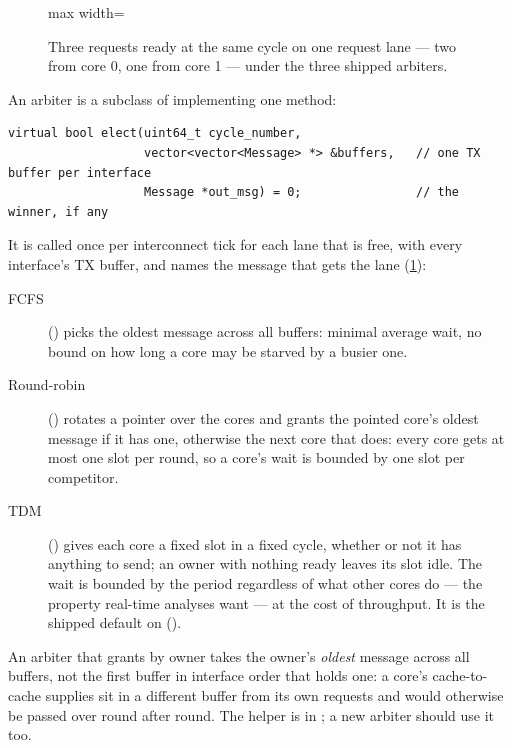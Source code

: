 \begin{figure}[htbp]\centering
\begin{adjustbox}{max width=\textwidth}\end{adjustbox}
\caption{Three requests ready at the same cycle on one request lane --- two from core 0, one
from core 1 --- under the three shipped arbiters.}
\label{fig:arbitration}
\end{figure}

An arbiter is a subclass of  implementing one method:

\begin{lstlisting}[style=cpp]
virtual bool elect(uint64_t cycle_number,
                   vector<vector<Message> *> &buffers,   // one TX buffer per interface
                   Message *out_msg) = 0;                // the winner, if any
\end{lstlisting}

It is called once per interconnect tick for each lane that is free, with every interface's TX
buffer, and names the message that gets the lane (\cref{fig:arbitration}):

\begin{description}
\item[FCFS] () picks the oldest message across all buffers: minimal average
  wait, no bound on how long a core may be starved by a busier one.
\item[Round-robin] () rotates a pointer over the cores and grants the pointed
  core's oldest message if it has one, otherwise the next core that does: every core gets at
  most one slot per round, so a core's wait is bounded by one slot per competitor.
\item[TDM] () gives each core a fixed slot in a fixed cycle, whether or not it
  has anything to send; an owner with nothing ready leaves its slot idle. The wait is bounded by
  the period regardless of what other cores do --- the property real-time analyses want --- at
  the cost of throughput. It is the shipped default on 
  ().
\end{description}

An arbiter that grants by owner takes the owner's \emph{oldest} message across all buffers,
not the first buffer in interface order that holds one: a core's cache-to-cache supplies sit in a
different buffer from its own requests and would otherwise be passed over round after round.
The helper is  in ; a new arbiter should use it too.

